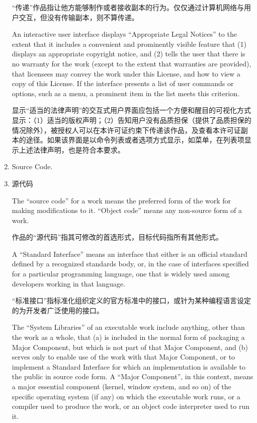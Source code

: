 \documentclass[11pt]{article}
\begin{document}
\begin{enumerate}
“传递”作品指让他方能够制作或者接收副本的行为。仅仅通过计算机网络与用户交互，但没有传输副本，则不算传递。

An interactive user interface displays ``Appropriate Legal Notices''
to the extent that it includes a convenient and prominently visible
feature that (1) displays an appropriate copyright notice, and (2)
tells the user that there is no warranty for the work (except to the
extent that warranties are provided), that licensees may convey the
work under this License, and how to view a copy of this License.  If
the interface presents a list of user commands or options, such as a
menu, a prominent item in the list meets this criterion.

显示“适当的法律声明”的交互式用户界面应包括一个方便和醒目的可视化方式显示：（1）适当的版权声明；（2）告知用户没有品质担保（提供了品质担保的情况除外），被授权人可以在本许可证约束下传递该作品，及查看本许可证副本的途径。如果该界面是以命令列表或者选项方式显示，如菜单，在列表项显示上述法律声明，也是符合本要求。

\item Source Code.
\item 源代码

The ``source code'' for a work means the preferred form of the work
for making modifications to it.  ``Object code'' means any non-source
form of a work.

作品的“源代码”指其可修改的首选形式，目标代码指所有其他形式。

A ``Standard Interface'' means an interface that either is an official
standard defined by a recognized standards body, or, in the case of
interfaces specified for a particular programming language, one that
is widely used among developers working in that language.

“标准接口”指标准化组织定义的官方标准中的接口，或针为某种编程语言设定的为开发者广泛使用的接口。

The ``System Libraries'' of an executable work include anything, other
than the work as a whole, that (a) is included in the normal form of
packaging a Major Component, but which is not part of that Major
Component, and (b) serves only to enable use of the work with that
Major Component, or to implement a Standard Interface for which an
implementation is available to the public in source code form.  A
``Major Component'', in this context, means a major essential component
(kernel, window system, and so on) of the specific operating system
(if any) on which the executable work runs, or a compiler used to
produce the work, or an object code interpreter used to run it.


\end{enumerate}
\end{document}
